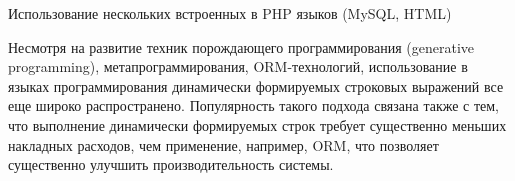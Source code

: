 \begin{listing}
\caption{Использование нескольких встроенных в PHP языков (MySQL, HTML)}
\label{lst:PhPSqlHtml}
\end{listing}


Несмотря на развитие техник порождающего программирования (generative programming), метапрограммирования, ORM-технологий, использование в языках программирования динамически формируемых строковых 
выражений все еще широко распространено. Популярность такого подхода связана также с тем, что выполнение динамически формируемых строк требует существенно меньших накладных расходов, чем применение, 
например, ORM, что позволяет существенно улучшить производительность системы.

